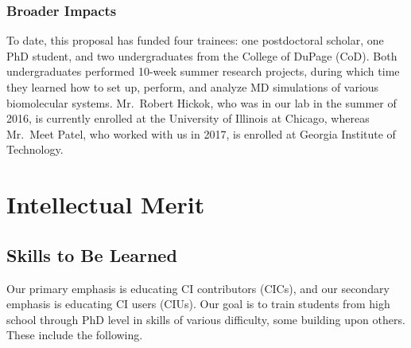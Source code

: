 \documentclass[11pt]{NSFamsart}
\begin{document}
\subsubsection{Broader Impacts} To date, this proposal has funded four trainees: one postdoctoral scholar, one PhD student, and two undergraduates from the College of DuPage (CoD).  Both undergraduates performed 10-week summer research projects, during which time they learned how to set up, perform, and analyze MD simulations of various biomolecular systems. Mr.~Robert Hickok, who was in our lab in the summer of 2016, is currently enrolled at the University of Illinois at Chicago, whereas Mr.~Meet Patel, who worked with us in 2017, is enrolled at Georgia Institute of Technology.  




\section{Intellectual Merit}

\subsection{Skills to Be Learned} \label{SkillsLearned}
Our primary emphasis is educating CI contributors (CICs), and our secondary emphasis is educating CI users (CIUs).  Our goal is to train students from high school through PhD level in skills of various difficulty, some building upon others.  These include the following.
\end{document}
